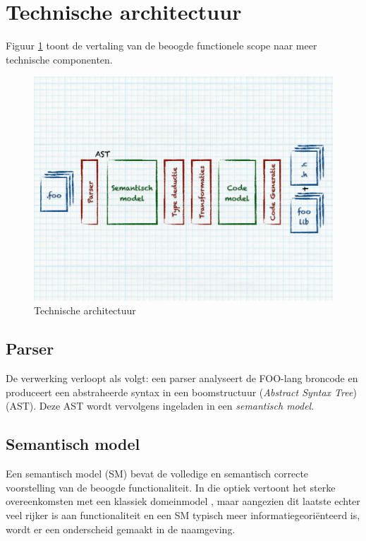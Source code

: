 \section{Technische architectuur}
\label{section:arch-technical}

Figuur \ref{fig:arch-technical} toont de vertaling van de beoogde functionele
scope naar meer technische componenten. 

\begin{figure}[ht]
  \centering
  \includegraphics[width=0.9\linewidth]{resources/arch-technical.pdf}
  \caption{Technische architectuur}
  \label{fig:arch-technical}
\end{figure}

\subsection{Parser}

De verwerking verloopt als volgt: een parser analyseert de FOO-lang broncode en
produceert een abstraheerde syntax in een boomstructuur (\emph{Abstract Syntax
Tree}) (AST). Deze AST wordt vervolgens ingeladen in een \emph{semantisch
model}.

\subsection{Semantisch model}
\label{subsection:arch-semantic-model}

Een semantisch model (SM) \citep{fowler2010domain} bevat de volledige en
semantisch correcte voorstelling van de beoogde functionaliteit. In die optiek
vertoont het sterke overeenkomsten met een klassiek domeinmodel
\citep{fowler2010domain}, maar aangezien dit laatste echter veel rijker is aan
functionaliteit en een SM typisch meer informatiegeori\"enteerd is, wordt er
een onderscheid gemaakt in de naamgeving.

